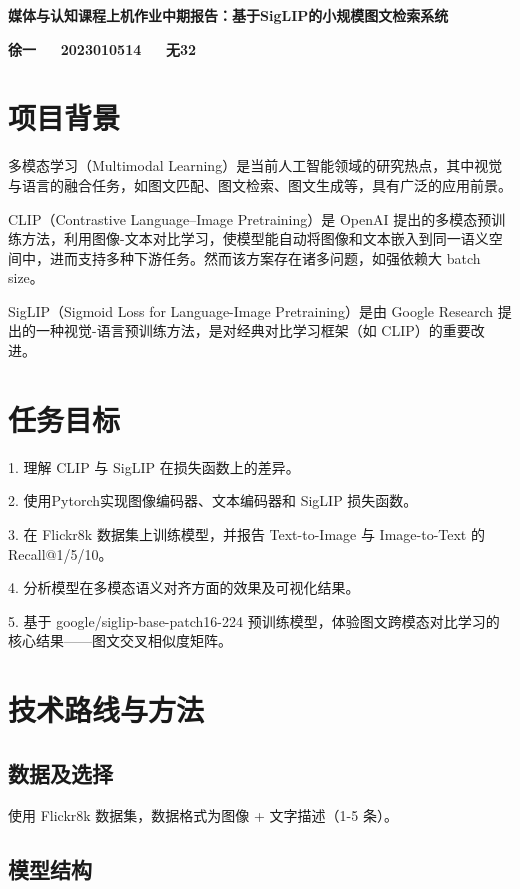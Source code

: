 \documentclass[a4paper]{article}
\begin{document}
\vspace{3mm}
\centerline{\textbf{\Large{媒体与认知课程上机作业中期报告：基于SigLIP的小规模图文检索系统}}}
\centerline{\textbf{{徐一 $\quad$ 2023010514 $\quad$ 无32}}}


\section{项目背景}

多模态学习（Multimodal Learning）是当前人工智能领域的研究热点，其中视觉与语言的融合任务，如图文匹配、图文检索、图文生成等，具有广泛的应用前景。

CLIP（Contrastive Language–Image Pretraining）是 OpenAI 提出的多模态预训练方法，利用图像-文本对比学习，使模型能自动将图像和文本嵌入到同一语义空间中，进而支持多种下游任务。然而该方案存在诸多问题，如强依赖大 batch size。

SigLIP（Sigmoid Loss for Language-Image Pretraining）是由 Google Research 提出的一种视觉-语言预训练方法，是对经典对比学习框架（如 CLIP）的重要改进。

\section{任务目标}

1. 理解 CLIP 与 SigLIP 在损失函数上的差异。

2. 使用Pytorch实现图像编码器、文本编码器和 SigLIP 损失函数。

3. 在 Flickr8k 数据集上训练模型，并报告 Text-to-Image 与 Image-to-Text 的 Recall@1/5/10。

4. 分析模型在多模态语义对齐方面的效果及可视化结果。

5. 基于 google/siglip-base-patch16-224 预训练模型，体验图文跨模态对比学习的核心结果——图文交叉相似度矩阵。


\section{技术路线与方法}

\subsection{数据及选择}

使用 Flickr8k 数据集，数据格式为图像 + 文字描述（1-5 条）。

\subsection{模型结构}
\end{document}

